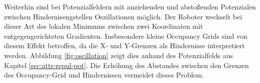 Weiterhin sind bei Potenzialfeldern mit anziehenden und abstoßenden Potenzialen zwischen Hindernisengstellen Oszillationen möglich. Der Roboter wechselt bei dieser Art des lokalen Minimums zwischen zwei Koordinaten mit entgegengerichteten Gradienten.
Insbesondere kleine Occupancy Grids sind von diesem Effekt betroffen, da die X- und Y-Grenzen als Hindernisse interpretiert werden. Abbildung \ref{fig:oscillation} zeigt dies anhand des Potenzialfelds aus Kapitel \ref{sec:attr-repul-pot}.
Die Erhöhung des Abstandes zwischen den Grenzen des Occupancy-Grid und Hindernissen vermeidet dieses Problem.
\begin{figure}[H]
	\footnotesize
	\centering
	\hspace*{\fill}
	\begin{minipage}{0.46\textwidth}%
		\centerline{}
	\end{minipage}
	\hspace*{\fill}
	\begin{minipage}{0.46\textwidth}%
		\footnotesize

\end{minipage}
\end{figure}
